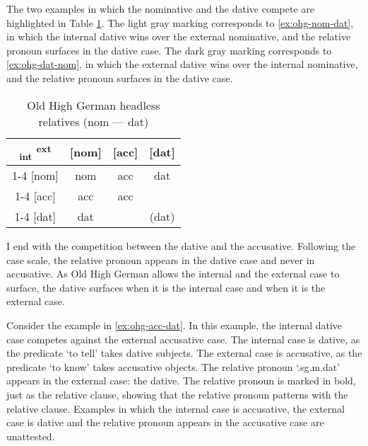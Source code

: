The two examples in which the nominative and the dative compete are highlighted in Table \ref{tbl:summary-old-high-german-nom-dat}. The light gray marking corresponds to \ref{ex:ohg-nom-dat}, in which the internal dative wins over the external nominative, and the relative pronoun surfaces in the dative case. The dark gray marking corresponds to \ref{ex:ohg-dat-nom}, in which the external dative wins over the internal nominative, and the relative pronoun surfaces in the dative case.

\begin{table}[ht]
  \center
  \caption{Old High German headless relatives (\ac{nom} --- \ac{dat})}
  \begin{tabular}{c|c|c|c}
    \toprule
        \textsubscript{\ac{int}} \textsuperscript{\ac{ext}}
          & [\ac{nom}]
          & [\ac{acc}]
          & [\ac{dat}]
          \\ \cmidrule{1-4}
      [\ac{nom}]
          & \ac{nom}
          & \ac{acc}
          & \cellcolor{DG}\ac{dat}
          \\ \cmidrule{1-4}
      [\ac{acc}]
          & \ac{acc}
          & \ac{acc}
          &
          \\ \cmidrule{1-4}
      [\ac{dat}]
          & \cellcolor{LG}\ac{dat}
          &
          & (\ac{dat})
          \\
    \bottomrule
  \end{tabular}
    \label{tbl:summary-old-high-german-nom-dat}
\end{table}

I end with the competition between the dative and the accusative. Following the case scale, the relative pronoun appears in the dative case and never in accusative. As Old High German allows the internal and the external case to surface, the dative surfaces when it is the internal case and when it is the external case.

Consider the example in \ref{ex:ohg-acc-dat}. In this example, the internal dative case competes against the external accusative case.
The internal case is dative, as the predicate  `to tell' takes dative subjects.
The external case is accusative, as the predicate  `to know' takes accusative objects.
The relative pronoun  `.\ac{sg}.\ac{m}.\ac{dat}' appears in the external case: the dative. The relative pronoun is marked in bold, just as the relative clause, showing that the relative pronoun patterns with the relative clause.
Examples in which the internal case is accusative, the external case is dative and the relative pronoun appears in the accusative case are unattested.

